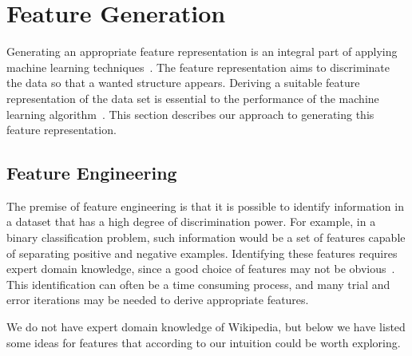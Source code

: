 \section{Feature Generation}\label{sec:feature_generation}
Generating an appropriate feature representation is an integral part of applying machine learning techniques~\cite{ng-lecture}. The feature representation aims to discriminate the data so that a wanted structure appears. Deriving a suitable feature representation of the data set is essential to the performance of the machine learning algorithm~\cite{ng-lecture}. This section describes our approach to generating this feature representation.



\subsection{Feature Engineering}
The premise of feature engineering is that it is possible to identify information in a dataset that has a high degree of discrimination power. For example, in a binary classification problem, such information would be a set of features capable of separating positive and negative examples. Identifying these features requires expert domain knowledge, since a good choice of features may not be obvious~\cite{ng-lecture}. This identification can often be a time consuming process, and many trial and error iterations may be needed to derive appropriate features.

We do not have expert domain knowledge of Wikipedia, but below we have listed some ideas for features that according to our intuition could be worth exploring.

